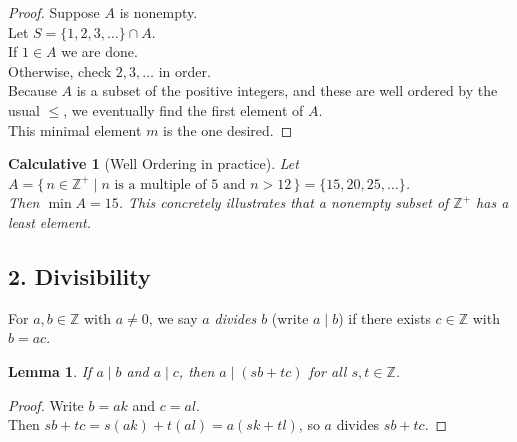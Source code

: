 \documentclass[12pt]{article}
\newtheorem{lemma}[theorem]{Lemma}
\newtheorem{calculative}[theorem]{Calculative}
\theoremstyle{definition}
\begin{document}
\vspace{1em}

\begin{proof}
Suppose $A$ is nonempty. \\

\noindent
Let $S = \{1,2,3,\dots\} \cap A$. \\

\noindent
If $1 \in A$ we are done. \\

\noindent
Otherwise, check $2,3,\dots$ in order. \\

\noindent
Because $A$ is a subset of the positive integers, and these are well ordered by the usual $\le$, we eventually find the first element of $A$. \\

\noindent
This minimal element $m$ is the one desired.
\end{proof}

\dotfill

\begin{calculative}[Well Ordering in practice]

\noindent
Let $A=\{\,n\in\mathbb{Z}^+ \mid n \text{ is a multiple of }5 \text{ and } n>12\,\}
=\{15,20,25,\dots\}$.  \\

\noindent
Then $\min A=15$. This concretely illustrates that a nonempty subset of $\mathbb{Z}^+$ has a least element.
\end{calculative}

\newpage

\subsection*{2. Divisibility}

\noindent
For $a,b\in\mathbb{Z}$ with $a\neq 0$, we say \emph{$a$ divides $b$} (write $a\mid b$) if there exists $c\in\mathbb{Z}$ with $b=ac$.

\dotfill

\begin{lemma}
If $a\mid b$ and $a\mid c$, then $a \mid (sb + tc)$ for all $s,t\in\mathbb{Z}$.
\end{lemma}

\vspace{1em}

\begin{proof}
Write $b=ak$ and $c=al$.\\

\noindent
Then $sb+tc = s(ak) + t(al) = a(sk+tl)$, so $a$ divides $sb+tc$.
\end{proof}
\end{document}
